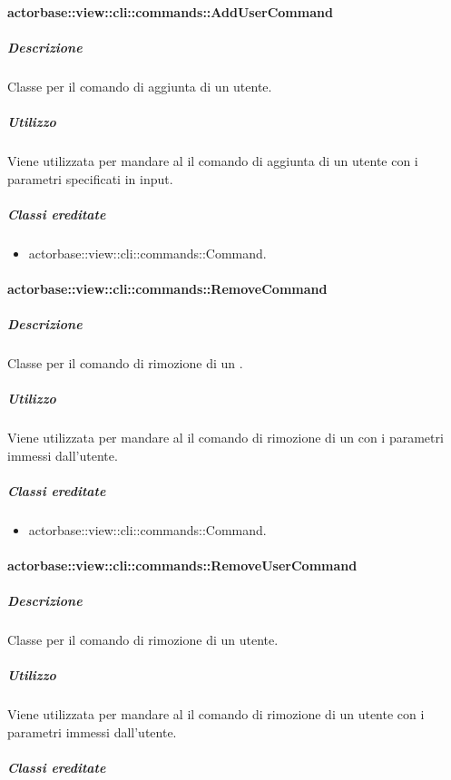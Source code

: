 \documentclass{scalatekids-article}
\begin{document}
\paragraph{actorbase::view::cli::commands::AddUserCommand}

\subparagraph{Descrizione}

Classe per il comando di aggiunta di un utente.

\subparagraph{Utilizzo}

Viene utilizzata per mandare al  il comando di aggiunta di
un utente con i parametri specificati in input.

\subparagraph{Classi ereditate}

\begin{itemize}
\item actorbase::view::cli::commands::Command.
\end{itemize}

\paragraph{actorbase::view::cli::commands::RemoveCommand}

\subparagraph{Descrizione}

Classe per il comando di rimozione di un .

\subparagraph{Utilizzo}

Viene utilizzata per mandare al  il comando di rimozione di
un  con i parametri immessi dall'utente.

\subparagraph{Classi ereditate}

\begin{itemize}
\item actorbase::view::cli::commands::Command.
\end{itemize}

\paragraph{actorbase::view::cli::commands::RemoveUserCommand}

\subparagraph{Descrizione}

Classe per il comando di rimozione di un utente.

\subparagraph{Utilizzo}

Viene utilizzata per mandare al  il comando di rimozione di
un utente con i parametri immessi dall'utente.

\subparagraph{Classi ereditate}
\end{document}
